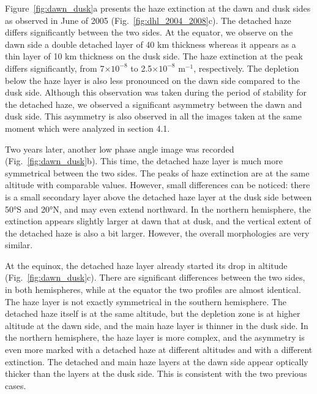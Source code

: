 Figure~\ref{fig:dawn_dusk}a presents the haze extinction at the dawn and dusk sides as observed
in June of 2005 (Fig.~\ref{fig:dhl_2004_2008}c). The detached haze differs significantly between the two sides.
At the equator, we observe on the dawn side a double detached layer of 40 km thickness whereas it appears
as a thin layer of 10 km thickness on the dusk side. The haze extinction at the peak differs significantly,
from 7$\times 10^{-8}$ to 2.5$\times 10^{-8}$ m$^{-1}$, respectively. The depletion below the haze layer
is also less pronounced on the dawn side compared to the dusk side. Although this observation was taken
during the period of stability for the detached haze, we observed a significant asymmetry between
the dawn and dusk side. This asymmetry is also observed in all the images taken at the same moment which were
analyzed in section 4.1.

Two years later, another low phase angle image was recorded (Fig.~\ref{fig:dawn_dusk}b).
This time, the detached haze layer is much more symmetrical between the two sides. The peaks of haze extinction
are at the same altitude with comparable values. However, small differences can be noticed: there is a
small secondary layer above the detached haze layer at the dusk side between \ang{50}S and \ang{20}N, and may even extend 
northward. In the northern hemisphere, the extinction appears slightly larger at dawn that at dusk, and the
vertical extent of the detached haze is also a bit larger. However, the overall morphologies are very similar.

At the equinox, the detached haze layer already started its drop in altitude (Fig.~\ref{fig:dawn_dusk}c).
There are significant differences between the two sides, in both hemispheres, while at the equator the two
profiles are almost identical. The haze layer is not exactly symmetrical in the southern hemisphere. The detached
haze itself is at the same altitude, but the depletion zone is at higher altitude at the dawn side, and the main
haze layer is thinner in the dusk side. In the northern hemisphere, the haze layer is more complex, and the
asymmetry is even more marked with a detached haze at different altitudes and with a different extinction. The
detached and main haze layers at the dawn side appear optically thicker than the layers at the dusk side.
This is consistent with the two previous cases.


